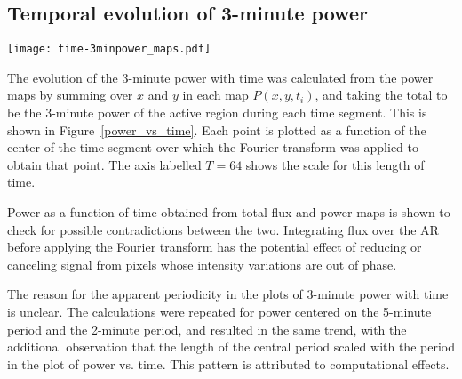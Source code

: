 \subsection{Temporal evolution of 3-minute power}

\begin{figure*}[htb!]\centering
    \texttt{[image: time-3minpower\_maps.pdf]}
    \caption{%
        Temporal evolution of the 3-minute power $P(t)$ in
        AIA 1600\AA{} (green curve) and AIA 1700\AA{} (purple curve).
        $P(t)$ per unsaturated pixel, obtained by summing over power maps
        whose pixel values = 0 if saturated, then divided by number of
        unsaturated pixels.
        Each point in time
        is plotted as a function of the center
        of the time segment over which the Fourier transform was applied to
        obtain the power map over which the point was summed.
        The vertical dashed lines mark the \textit{GOES} start, peak, and end
        times of the flare at 01:44, 01:56, and 02:06 UT, respectively.
        \label{power_vs_time}}
\end{figure*}


The evolution of the 3-minute power with time
was calculated from the power maps
by summing over $x$ and $y$ in each map $P(x,y,t_{i})$, and taking the total
to be the 3-minute power of the active region during each time segment.
This is shown in Figure~\ref{power_vs_time}.
Each point is plotted as a function of the center of the time segment
over which the Fourier transform was applied to obtain that point.
The axis labelled $T=64$ shows the scale for this length of time.

Power as a function of time obtained from total flux and power maps
is shown to check for possible contradictions between the two.
Integrating flux over the AR
before applying the Fourier transform
has the potential effect of reducing or canceling signal from
pixels whose intensity variations are out of phase.

The reason for the apparent periodicity in the plots of 3-minute power with time
is unclear.
The calculations were repeated for power centered on the
5-minute period and the 2-minute period,
and resulted in the same trend,
with the additional observation
that the length of the central period
scaled with the period in the plot of power vs. time.
This pattern is attributed to computational effects.


